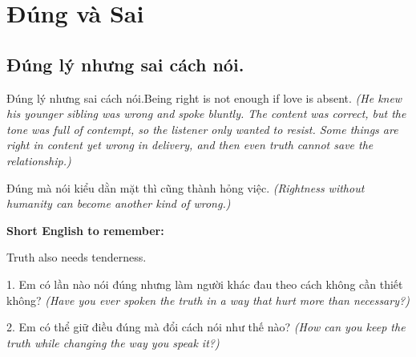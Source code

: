 \chapter{Đúng và Sai}

\section{Đúng lý nhưng sai cách nói.}
\begin{truyen}{Đúng lý nhưng sai cách nói.}{Being right is not enough if love is absent.}
\textit{(He knew his younger sibling was wrong and spoke bluntly. The content was correct, but the tone was full of contempt, so the listener only wanted to resist. Some things are right in content yet wrong in delivery, and then even truth cannot save the relationship.)}
\end{truyen}
\begin{baihoc}
Đúng mà nói kiểu dằn mặt thì cũng thành hỏng việc.
\textit{(Rightness without humanity can become another kind of wrong.)}
\end{baihoc}
\begin{ghinhoanh}
\textbf{Short English to remember:}

Truth also needs tenderness.
\end{ghinhoanh}
\begin{tuhocnhanh}
1. Em có lần nào nói đúng nhưng làm người khác đau theo cách không cần thiết không? \textit{(Have you ever spoken the truth in a way that hurt more than necessary?)}

2. Em có thể giữ điều đúng mà đổi cách nói như thế nào? \textit{(How can you keep the truth while changing the way you speak it?)}
\end{tuhocnhanh}
\ngancach

